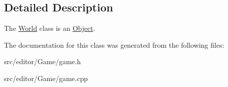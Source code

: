\subsection{\-Detailed \-Description}
\-The \hyperlink{class_world}{\-World} class is an \hyperlink{class_object}{\-Object}. 

\-The documentation for this class was generated from the following files\-:\begin{DoxyCompactItemize}
\item 
src/editor/\-Game/game.\-h\item 
src/editor/\-Game/game.\-cpp\end{DoxyCompactItemize}
